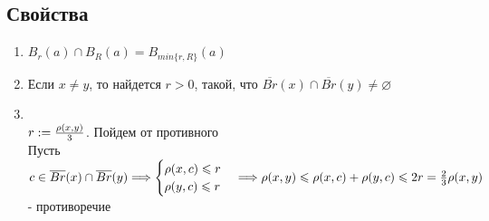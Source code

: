 \documentclass[12pt,letterpaper]{report}
\makeatletter
\renewenvironment{proof}[1][\proofname]{%
   \par\pushQED{\qed}\normalfont%
   \topsep6\p@\@plus6\p@\relax
   \trivlist\item[\hskip\labelsep\bfseries#1\@addpunct{.}]%
   \ignorespaces
}{%
   \popQED\endtrivlist\@endpefalse
}
\makeatother
\begin{document}
    \subsection*{Свойства}
    \begin{enumerate}
        \item $B_r(a) \cap B_R(a) = B_{min\{r, R\}}(a)$
        \item Если $x \neq y$, то найдется $r > 0$, такой, что 
        $\overline{Br}(x) \cap \overline{Br}(y) \neq \varnothing$
        \begin{proof}
            \quad \\
            $r := {{\rho(x, y)}\over{3}}$. Пойдем от противного \\
            Пусть $c \in \overline{Br}(x) \cap \overline{Br}(y) \Longrightarrow
            \begin{cases}
                \rho(x, c) \leqslant r \\
                \rho(y, c) \leqslant r
            \end{cases} \Longrightarrow \rho(x, y) \leqslant \rho(x, c) + \rho(y, c) 
            \leqslant 2r = {{2}\over{3}}\rho(x, y)$ - противоречие
        \end{proof}
    \end{enumerate}
\end{document}
